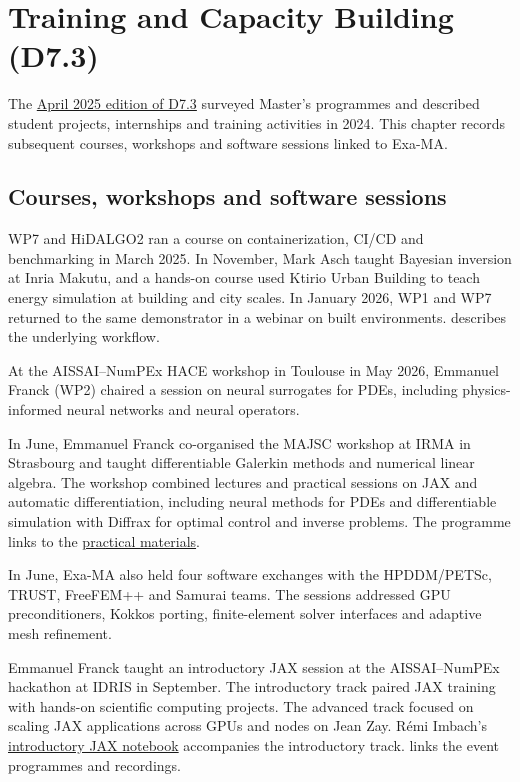 \chapter{Training and Capacity Building (D7.3)}
\label{chap:training}

The \href{https://drive.google.com/file/d/1d4AKTGNbD74n90d5RESHytOr-M56sFIm}{April 2025 edition of D7.3}
surveyed Master's programmes and described student projects, internships and
training activities in 2024. This chapter records subsequent courses,
workshops and software sessions linked to Exa-MA.

\section{Courses, workshops and software sessions}

WP7 and HiDALGO2 ran a course on containerization, CI/CD and benchmarking in
March 2025. In November, Mark Asch taught Bayesian inversion at Inria
Makutu, and a hands-on course used Ktirio Urban Building to teach
energy simulation at building and city scales. In January 2026, WP1 and WP7
returned to the same demonstrator in a webinar on built environments.
 describes the underlying workflow.

At the AISSAI--NumPEx HACE workshop in Toulouse in May 2026, Emmanuel Franck
(WP2) chaired a session on neural surrogates for PDEs, including
physics-informed neural networks and neural operators.

In June, Emmanuel Franck co-organised the MAJSC workshop at IRMA in
Strasbourg and taught differentiable Galerkin methods and numerical
linear algebra. The workshop combined lectures and practical sessions
on JAX and automatic differentiation, including neural methods for PDEs
and differentiable simulation with Diffrax for optimal control and
inverse problems. The programme links to the
\href{https://gitlab.math.unistra.fr/majsc2026/hands-on}{practical materials}.

In June, Exa-MA also held four software exchanges with the HPDDM/PETSc,
TRUST, FreeFEM++ and Samurai teams. The sessions addressed GPU
preconditioners, Kokkos porting, finite-element solver interfaces and
adaptive mesh refinement.

Emmanuel Franck taught an introductory JAX session at the
AISSAI--NumPEx hackathon at IDRIS in September. The introductory track
paired JAX training with hands-on scientific computing projects. The
advanced track focused on scaling JAX applications across GPUs and nodes
on Jean Zay. Rémi Imbach's
\href{https://gist.github.com/rimbach/ee711e50d892906e3574684af5b747e7}{introductory JAX notebook}
accompanies the introductory track.
 links the event programmes and recordings.

